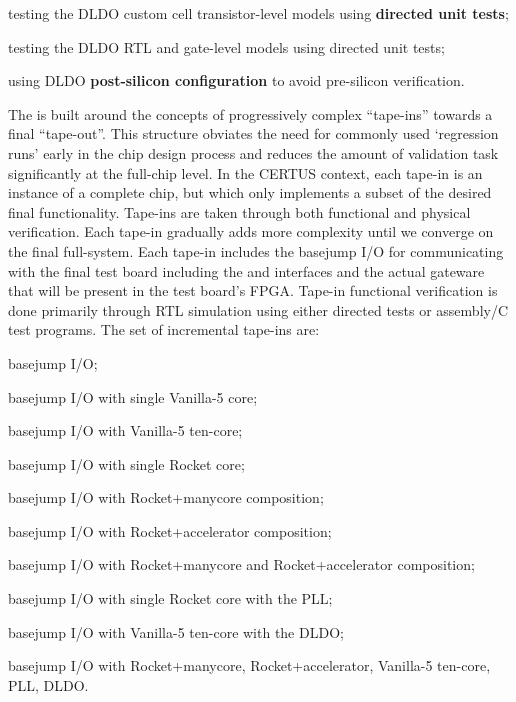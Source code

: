 \begin{cbxlist}{1.5em}{1em}{1em}
\begin{cbxlist}[--]{1.5em}{0em}{0em}
      \item testing the DLDO custom cell transistor-level models using
         {\bf directed unit tests};

      \item testing the DLDO RTL and gate-level models using directed
         unit tests;

      \item using DLDO {\bf post-silicon configuration} to avoid pre-silicon
         verification.

    \end{cbxlist}

 \item The  is 
 built around the concepts of progressively complex ``tape-ins'' towards a final ``tape-out''. This structure obviates the need for commonly used 
 `regression runs' early in the chip design process and reduces the amount of validation task significantly at the full-chip level. In the CERTUS context, each tape-in is an instance of a complete chip, but which only
    implements a subset of the desired final functionality. Tape-ins are
    taken through both functional and physical verification. Each tape-in
    gradually adds more complexity until we converge on the final
    full-system. Each tape-in includes the basejump I/O for communicating
    with the final test board including the  and
     interfaces and the actual gateware that will be present
    in the test board's FPGA. Tape-in functional verification is done
    primarily through RTL simulation using either directed tests or
    assembly/C test programs. The set of incremental tape-ins are:

    \smallskip
    \begin{cbxlist}[--]{1.5em}{0em}{0em}
      \raggedright

      \item basejump I/O;
      \item basejump I/O with single Vanilla-5 core;
      \item basejump I/O with Vanilla-5 ten-core;
      \item basejump I/O with single Rocket core;
      \item basejump I/O with Rocket+manycore composition;
      \item basejump I/O with Rocket+accelerator composition;
      \item basejump I/O with Rocket+manycore and Rocket+accelerator composition;
      \item basejump I/O with single Rocket core with the PLL;
      \item basejump I/O with Vanilla-5 ten-core with the DLDO;
      \item basejump I/O with Rocket+manycore, Rocket+accelerator,
         Vanilla-5 ten-core, PLL, DLDO.


\end{cbxlist}
\end{cbxlist}
